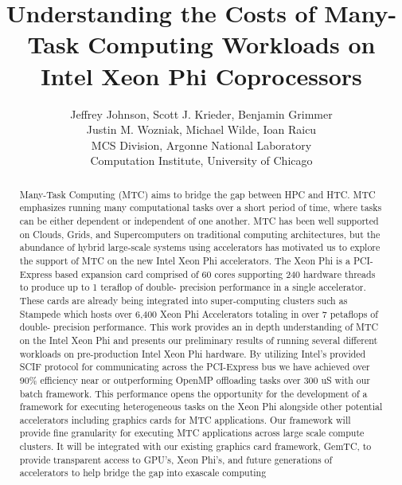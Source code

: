 \documentclass[conference]{IEEEtran}
\begin{document}
%
\title{Understanding the Costs of Many-Task Computing Workloads on Intel Xeon Phi Coprocessors}


\author{Jeffrey Johnson,
Scott J. Krieder,
Benjamin Grimmer\\
Justin M. Wozniak,
Michael Wilde,
Ioan Raicu\\
MCS Division, Argonne National Laboratory\\
Computation Institute, University of Chicago
}


\maketitle


\begin{abstract}
Many-Task Computing (MTC) aims to bridge the gap between HPC and HTC. MTC emphasizes running many computational tasks over a short period of time, where tasks can be either dependent or independent of one another. MTC has been well supported on Clouds, Grids, and Supercomputers on traditional computing architectures, but the abundance of hybrid large-scale systems using accelerators has motivated us to explore the support of MTC on the new Intel Xeon Phi accelerators. The Xeon Phi is a PCI-Express based expansion card comprised of 60 cores supporting 240 hardware threads to produce up to 1 teraflop of double- precision performance in a single accelerator. These cards are already being integrated into super-computing clusters such as Stampede which hosts over 6,400 Xeon Phi Accelerators totaling in over 7 petaflops of double- precision performance. This work provides an in depth understanding of MTC on the Intel Xeon Phi and presents our preliminary results of running several different workloads on pre-production Intel Xeon Phi hardware. By utilizing Intel’s provided SCIF protocol for communicating across the PCI-Express bus we have achieved over 90\% efficiency near or outperforming OpenMP offloading tasks over 300 uS with our batch framework. This performance opens the opportunity for the development of a framework for executing heterogeneous tasks on the Xeon Phi alongside other potential accelerators including graphics cards for MTC applications. Our framework will provide fine granularity for executing MTC applications across large scale compute clusters. It will be integrated with our existing graphics card framework, GemTC, to provide transparent access to GPU’s, Xeon Phi’s, and future generations of accelerators to help bridge the gap into exascale computing
\end{abstract}
\end{document}
